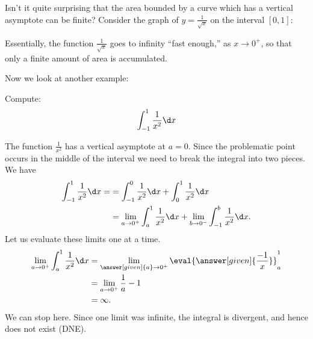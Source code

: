 \documentclass{ximera}
\begin{document}
\begin{example}
\begin{explanation}
Isn't it quite surprising that the area bounded by a curve which has a
vertical asymptote can be finite? Consider the graph of $y=
\frac{1}{\sqrt{x}}$ on the interval $[0,1]$:
\begin{image}
\end{image}
Essentially, the function $\frac{1}{\sqrt{x}}$ goes to infinity ``fast
enough,'' as $x\to 0^+$, so that only a finite amount of area is
accumulated. 

  \end{explanation}
\end{example}

Now we look at another example: 

\begin{example}	
  Compute:
  \[
  \int_{-1}^1 \frac{1}{x^2} \d x
  \]
  \begin{explanation}
    The function $\frac{1}{x^2}$ has a vertical asymptote at $a=0$. Since the problematic point 
occurs in the middle of the interval we need to break the integral into two pieces.
  We have
\begin{align*}
  \int_{-1}^1 \frac{1}{x^{2}} \d x =&= \int_{-1}^{0} \frac{1}{x^{2}} \d x + \int_{0}^{1} \frac{1}{x^{2}} \d x \\
&= \lim_{a \to 0^+} \int_{a}^1 \frac{1}{x^2} \d x  + \lim_{b \to 0^-} \int_{-1}^{b} \frac{1}{x^2} \d x.
 \end{align*}
  Let us evaluate these limits one at a time.
  \begin{align*}
    \lim_{a \to 0^+} \int_{a}^1 \frac{1}{x^2} \d x  &=  \lim_{\answer[given]{a} \to 0^+} \eval{\answer[given]{\frac{-1}{x}}}_a^1 \\
    &=  \lim_{a \to 0^+} \frac{1}{a}-1\\
    &= \infty.
  \end{align*}
    We can stop here. Since one limit was infinite, the integral is
    divergent, and hence does not exist (DNE). 
  \end{explanation}
\end{example}
\end{document}
